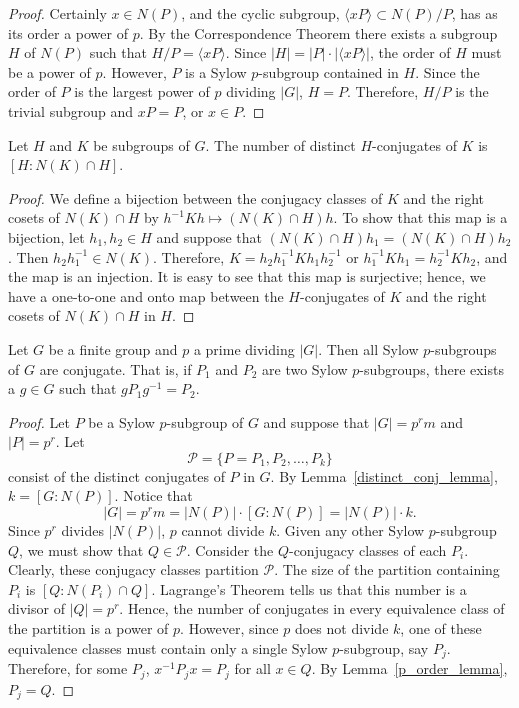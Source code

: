  
\begin{proof}
Certainly $x \in N(P)$, and the cyclic subgroup, $\langle xP \rangle
\subset N(P)/P$, has as its order a power of $p$. By the Correspondence
Theorem there exists a subgroup $H$ of $N(P)$ such that $H/P = \langle
xP \rangle$. Since $|H| = |P| \cdot |\langle xP \rangle|$, the order
of $H$ must be a power of $p$. However, $P$ is a Sylow $p$-subgroup
contained in $H$. Since the order of $P$ is the largest power of $p$
dividing $|G|$, $H=P$.  Therefore,  $H/P$ is the trivial subgroup and
$xP = P$, or $x \in P$. 
\end{proof}
 
 
\begin{lemma}\label{distinct_conj_lemma}
Let $H$ and $K$ be subgroups of $G$. The number of distinct
$H$-conjugates of $K$ is $[H:N(K) \cap H]$. 
\end{lemma}
 
 
\begin{proof}
We define a bijection between the conjugacy classes of $K$ and the
right cosets of $N(K) \cap H$ by $h^{-1}Kh \mapsto (N(K) \cap H)h$.
To show that this map is a bijection, let $h_1, h_2 \in H$ and suppose
that $(N(K) \cap H)h_1 = (N(K) \cap H)h_2$. Then $h_2 h_1^{-1} \in
N(K)$. Therefore, $K = h_2 h_1^{-1} K h_1 h_2^{-1}$ or $h_1^{-1} K h_1
= h_2^{-1} K h_2$, and the map is an injection.  It is easy to see
that this map is surjective; hence, we have a one-to-one and onto map
between the $H$-conjugates of $K$ and the right cosets of $N(K) \cap
H$ in $H$.
\end{proof}
 
 
\begin{theorem}\label{sylow:Sylow_two_theorem}
Let $G$ be a finite group and $p$ a prime dividing $|G|$. Then all
Sylow $p$-subgroups of $G$ are conjugate. That is, if $P_1$ and $P_2$
are two Sylow $p$-subgroups, there exists a $g \in G$ such that $g P_1
g^{-1} = P_2$. 
\end{theorem}
 
 
\begin{proof}
Let $P$ be a Sylow $p$-subgroup of $G$ and suppose that $|G|=p^r m$
and $|P|=p^r$. Let 
\[
{\mathcal P} = \{ P = P_1, P_2, \ldots, P_k \}
\]
consist of the distinct conjugates of $P$ in $G$.  By Lemma~\ref{distinct_conj_lemma}, $k =
[G: N(P)]$. Notice that 
\[
|G|= p^r m = |N(P)| \cdot [G: N(P)]= |N(P)| \cdot k.
\]
Since $p^r$ divides $|N(P)|$, $p$ cannot divide $k$. Given any other
Sylow $p$-subgroup $Q$, we must show that $Q \in {\mathcal P}$. Consider
the $Q$-conjugacy classes of each $P_i$. Clearly, these conjugacy
classes partition ${\mathcal P}$. The size of the partition containing
$P_i$ is $[Q :N(P_i) \cap Q]$. Lagrange's Theorem tells us that this
number is a divisor of $|Q|= p^r$. Hence, the number of conjugates in
every equivalence class of the partition is a power of $p$. However,
since $p$ does not divide $k$, one of these equivalence classes must
contain only a single Sylow $p$-subgroup, say $P_j$. Therefore, for
some $P_j$, $x^{-1} P_j x = P_j$ for all $x \in Q$. By Lemma~\ref{p_order_lemma},
$P_j = Q$. 
\end{proof}
 
